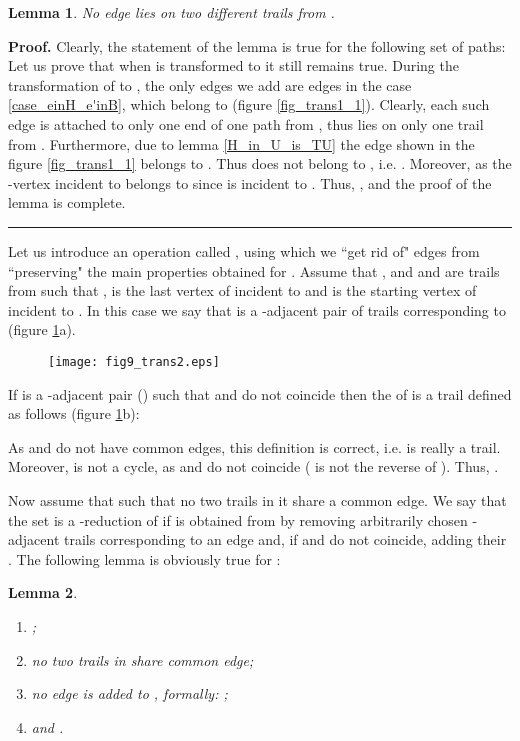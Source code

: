 \documentclass[a4paper, 12pt]{article}
\newtheorem{lemma}{Lemma}[subsection]
\newenvironment{proof}[1][Proof]{\noindent\textbf{#1.} }{\ \rule{0.5em}{0.5em}}
\begin{document}
\begin{lemma}\label{no_A'paths_share_the_same_edge}
No edge lies on two different trails from .
\end{lemma}
\begin{proof}
Clearly, the statement of the lemma is true for the following set of
paths:  Let us prove that when
 is transformed to  it still remains true. During the
transformation of  to , the only edges we add are edges
 in the case \ref{case_einH_e'inB}, which belong to  (figure \ref{fig_trans1_1}). Clearly, each such edge
 is attached to only one end of one path from , thus
lies on only one trail from . Furthermore, due to lemma
\ref{H_in_U_is_TU} the edge  shown in the figure
\ref{fig_trans1_1} belongs to . Thus  does not belong to
, i.e. . Moreover,  as the -vertex incident to  belongs to  since
is incident to . Thus, ,
and the proof of the lemma is complete.
\end{proof}

Let us introduce an operation called , using which we ``get
rid of" edges from  ``preserving" the main properties obtained
for . Assume that , and  and  are
trails from  such that ,  is the last vertex of  incident to  and
 is the starting vertex of  incident to . In this case
we say that  is a -adjacent pair of trails
corresponding to  (figure \ref{fig_trans2}a).

\begin{figure}[h]
\begin{center}
\texttt{[image: fig9\_trans2.eps]}\\
\caption{}\label{fig_trans2}
\end{center}
\end{figure}

If  is a -adjacent pair () such that  and  do not coincide
then the  of  is a trail defined as follows
(figure \ref{fig_trans2}b):

As  and  do not have common edges, this definition is
correct, i.e.  is really a trail. Moreover,  is not a cycle,
as  and  do not coincide ( is not the reverse of
). Thus, .

Now assume that  such that no
two trails in it share a common edge. We say that the set  is a
-reduction of  if  is obtained from  by removing
arbitrarily chosen -adjacent trails 
corresponding to an edge  and, if  and 
do not coincide, adding their . The following lemma is
obviously true for :
\begin{lemma}\label{W'_properties}\
\renewcommand{\labelenumi}{(\arabic{enumi})}
\begin{enumerate}
\item \label{W'_in_T_o} ;
\item \label{preserve} no two trails in  share common edge;
\item \label{no_new_edge} no edge is added to , formally: ;
\item \label{end_edges_decrement}  and .
\end{enumerate}
\end{lemma}
\end{document}
